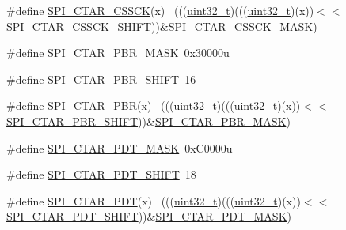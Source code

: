 \begin{DoxyCompactItemize}
\#define \hyperlink{group___s_p_i___register___masks_gaae5d1ed90890f6ecb4dc23e79dcb8473}{S\+P\+I\+\_\+\+C\+T\+A\+R\+\_\+\+C\+S\+S\+CK}(x)                                            ~(((\hyperlink{_p_e___types_8h_a33594304e786b158f3fb30289278f5af}{uint32\+\_\+t})(((\hyperlink{_p_e___types_8h_a33594304e786b158f3fb30289278f5af}{uint32\+\_\+t})(x))$<$$<$\hyperlink{group___s_p_i___register___masks_gaf4e35373d2e9149e1c73f9b65887ad37}{S\+P\+I\+\_\+\+C\+T\+A\+R\+\_\+\+C\+S\+S\+C\+K\+\_\+\+S\+H\+I\+FT}))\&\hyperlink{group___s_p_i___register___masks_ga5c824276fa48ae7b05fc922d20d237c0}{S\+P\+I\+\_\+\+C\+T\+A\+R\+\_\+\+C\+S\+S\+C\+K\+\_\+\+M\+A\+SK})
\item 
\#define \hyperlink{group___s_p_i___register___masks_ga4f40ea2ab0d14559523ab0699fd682c6}{S\+P\+I\+\_\+\+C\+T\+A\+R\+\_\+\+P\+B\+R\+\_\+\+M\+A\+SK}~0x30000u
\item 
\#define \hyperlink{group___s_p_i___register___masks_gaf53f764d59da1c7a68c9185a71dfec66}{S\+P\+I\+\_\+\+C\+T\+A\+R\+\_\+\+P\+B\+R\+\_\+\+S\+H\+I\+FT}~16
\item 
\#define \hyperlink{group___s_p_i___register___masks_gaf42de6772eb7b71709130412e9926de7}{S\+P\+I\+\_\+\+C\+T\+A\+R\+\_\+\+P\+BR}(x)                                                ~(((\hyperlink{_p_e___types_8h_a33594304e786b158f3fb30289278f5af}{uint32\+\_\+t})(((\hyperlink{_p_e___types_8h_a33594304e786b158f3fb30289278f5af}{uint32\+\_\+t})(x))$<$$<$\hyperlink{group___s_p_i___register___masks_gaf53f764d59da1c7a68c9185a71dfec66}{S\+P\+I\+\_\+\+C\+T\+A\+R\+\_\+\+P\+B\+R\+\_\+\+S\+H\+I\+FT}))\&\hyperlink{group___s_p_i___register___masks_ga4f40ea2ab0d14559523ab0699fd682c6}{S\+P\+I\+\_\+\+C\+T\+A\+R\+\_\+\+P\+B\+R\+\_\+\+M\+A\+SK})
\item 
\#define \hyperlink{group___s_p_i___register___masks_ga3680f8dc0308705f06e234914edfa14b}{S\+P\+I\+\_\+\+C\+T\+A\+R\+\_\+\+P\+D\+T\+\_\+\+M\+A\+SK}~0x\+C0000u
\item 
\#define \hyperlink{group___s_p_i___register___masks_ga4201dd4e39a23f36fc01eb3f74b7c094}{S\+P\+I\+\_\+\+C\+T\+A\+R\+\_\+\+P\+D\+T\+\_\+\+S\+H\+I\+FT}~18
\item 
\#define \hyperlink{group___s_p_i___register___masks_ga82d7181aa31c2d4fde7cbfecca2af39c}{S\+P\+I\+\_\+\+C\+T\+A\+R\+\_\+\+P\+DT}(x)                                                ~(((\hyperlink{_p_e___types_8h_a33594304e786b158f3fb30289278f5af}{uint32\+\_\+t})(((\hyperlink{_p_e___types_8h_a33594304e786b158f3fb30289278f5af}{uint32\+\_\+t})(x))$<$$<$\hyperlink{group___s_p_i___register___masks_ga4201dd4e39a23f36fc01eb3f74b7c094}{S\+P\+I\+\_\+\+C\+T\+A\+R\+\_\+\+P\+D\+T\+\_\+\+S\+H\+I\+FT}))\&\hyperlink{group___s_p_i___register___masks_ga3680f8dc0308705f06e234914edfa14b}{S\+P\+I\+\_\+\+C\+T\+A\+R\+\_\+\+P\+D\+T\+\_\+\+M\+A\+SK})
$$
\end{DoxyCompactItemize}
